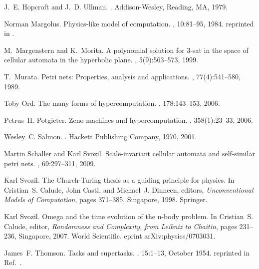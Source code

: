 \documentclass{article}
\theoremstyle{definition}
\begin{document}
\begin{thebibliography}{Mur89}
J.~E. Hopcroft and J.~D. Ullman.
.
\newblock Addison-Wesley, Reading, MA, 1979.

Norman Margolus.
\newblock Physics-like model of computation.
, 10:81--95, 1984.
\newblock reprinted in \cite[Part I, Chapter 4]{adama02}.

M.~Margenstern and K.~Morita.
\newblock A polynomial solution for 3-sat in the space of cellular automata in
  the hyperbolic plane.
, 5(9):563--573, 1999.

T.~Murata.
\newblock Petri nets: Properties, analysis and applications.
, 77(4):541--580, 1989.

Toby Ord.
\newblock The many forms of hypercomputation.
, 178:143--153, 2006.

Petrus~H. Potgieter.
\newblock Zeno machines and hypercomputation.
, 358(1):23--33, 2006.

Wesley~C. Salmon.
.
\newblock Hackett Publishing Company, 1970, 2001.

Martin Schaller and Karl Svozil.
\newblock Scale-invariant cellular automata and self-similar petri nets.
, 69:297--311, 2009.

Karl Svozil.
\newblock The {C}hurch-{T}uring thesis as a guiding principle for physics.
\newblock In Cristian~S. Calude, John Casti, and Michael~J. Dinneen, editors,
  {\em Unconventional Models of Computation}, pages 371--385, Singapore, 1998.
  Springer.

Karl Svozil.
\newblock Omega and the time evolution of the n-body problem.
\newblock In Cristian~S. Calude, editor, {\em Randomness and Complexity, from
  {L}eibniz to {C}haitin}, pages 231--236, Singapore, 2007. World Scientific.
\newblock eprint arXiv:physics/0703031.

James~F. Thomson.
\newblock Tasks and supertasks.
, 15:1--13, October 1954.
\newblock reprinted in Ref.~\cite[pp.~89-102]{salmon-01}.


\end{thebibliography}
\end{document}
